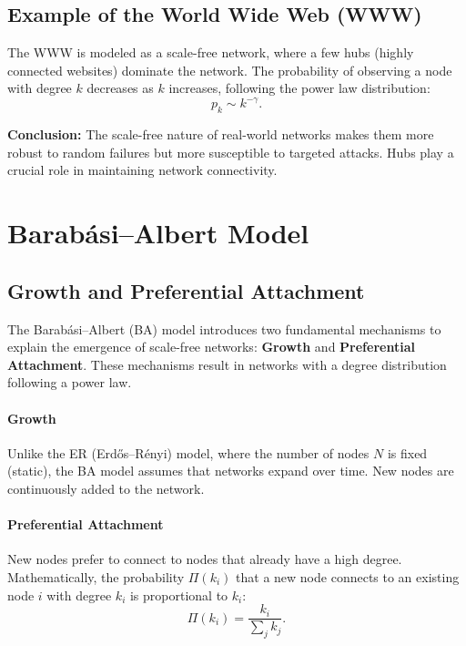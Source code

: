 \documentclass{article}
\begin{document}
\subsection{Example of the World Wide Web (WWW)}
The WWW is modeled as a scale-free network, where a few hubs (highly connected websites) dominate the network. The probability of observing a node with degree $k$ decreases as $k$ increases, following the power law distribution:
\begin{equation}
    p_k \sim k^{-\gamma}.
\end{equation}

\textbf{Conclusion:} The scale-free nature of real-world networks makes them more robust to random failures but more susceptible to targeted attacks. Hubs play a crucial role in maintaining network connectivity.


\section{Barabási–Albert Model}

\subsection{Growth and Preferential Attachment}
The Barabási–Albert (BA) model introduces two fundamental mechanisms to explain the emergence of scale-free networks: \textbf{Growth} and \textbf{Preferential Attachment}. These mechanisms result in networks with a degree distribution following a power law.

\paragraph{Growth}
Unlike the ER (Erdős–Rényi) model, where the number of nodes \( N \) is fixed (static), the BA model assumes that networks expand over time. New nodes are continuously added to the network.

\paragraph{Preferential Attachment}
New nodes prefer to connect to nodes that already have a high degree. Mathematically, the probability \( \Pi(k_i) \) that a new node connects to an existing node \( i \) with degree \( k_i \) is proportional to \( k_i \):
\begin{equation}
\Pi(k_i) = \frac{k_i}{\sum_j k_j}.
\end{equation}
\end{document}
